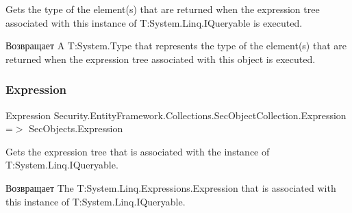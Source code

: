 Gets the type of the element(s) that are returned when the expression tree associated with this instance of T\+:\+System.\+Linq.\+I\+Queryable is executed. 

\begin{DoxyReturn}{Возвращает}
A T\+:\+System.\+Type that represents the type of the element(s) that are returned when the expression tree associated with this object is executed. 
\end{DoxyReturn}
\mbox{\label{class_security_1_1_entity_framework_1_1_collections_1_1_sec_object_collection_a60d45de2ee61976cb4a778bcd7c537a7}} 
\subsubsection{\texorpdfstring{Expression}{Expression}}
{\footnotesize\ttfamily Expression Security.\+Entity\+Framework.\+Collections.\+Sec\+Object\+Collection.\+Expression =$>$ Sec\+Objects.\+Expression}



Gets the expression tree that is associated with the instance of T\+:\+System.\+Linq.\+I\+Queryable. 

\begin{DoxyReturn}{Возвращает}
The T\+:\+System.\+Linq.\+Expressions.\+Expression that is associated with this instance of T\+:\+System.\+Linq.\+I\+Queryable. 
\end{DoxyReturn}
\mbox{\label{class_security_1_1_entity_framework_1_1_collections_1_1_sec_object_collection_a3c9d94cbd97a670d886c39df79276a75}} 
